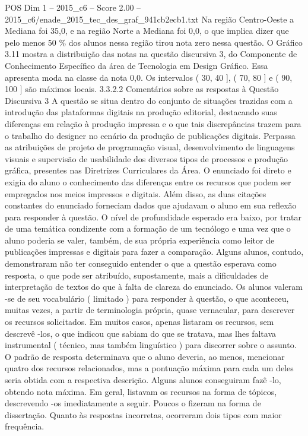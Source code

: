 \begin{textsample}{POS Dim 1 – 2015\_c6 – Score 2.00 – 2015\_c6/enade\_2015\_tec\_des\_graf\_941cb2ecb1.txt}
Na região Centro-Oeste a Mediana foi 35,0, e na região Norte a Mediana foi 0,0, o que implica dizer que pelo menos 50 \% dos alunos nessa região tirou nota zero nessa questão.
O Gráfico 3.11 mostra a distribuição das notas na questão discursiva 3, do Componente de Conhecimento Específico da área de Tecnologia em Design Gráfico.
Essa apresenta moda na classe da nota 0,0.
Os intervalos ( 30, 40 ], ( 70, 80 ] e ( 90, 100 ] são máximos locais. 3.3.2.2 Comentários sobre as respostas à Questão Discursiva 3 A questão se situa dentro do conjunto de situações trazidas com a introdução das plataformas digitais na produção editorial, destacando suas diferenças em relação à produção impressa e o que tais discrepâncias trazem para o trabalho do designer no cenário da produção de publicações digitais.
Perpassa as atribuições de projeto de programação visual, desenvolvimento de linguagens visuais e supervisão de usabilidade dos diversos tipos de processos e produção gráfica, presentes nas Diretrizes Curriculares da Área.
O enunciado foi direto e exigia do aluno o conhecimento das diferenças entre os recursos que podem ser empregados nos meios impressos e digitais.
Além disso, as duas citações constantes do enunciado forneciam dados que ajudavam o aluno em sua reflexão para responder à questão.
O nível de profundidade esperado era baixo, por tratar de uma temática condizente com a formação de um tecnólogo e uma vez que o aluno poderia se valer, também, de sua própria experiência como leitor de publicações impressas e digitais para fazer a comparação.
Alguns alunos, contudo, demonstraram não ter conseguido entender o que a questão esperava como resposta, o que pode ser atribuído, supostamente, mais a dificuldades de interpretação de textos do que à falta de clareza do enunciado.
Os alunos valeram -se de seu vocabulário ( limitado ) para responder à questão, o que aconteceu, muitas vezes, a partir de terminologia própria, quase vernacular, para descrever os recursos solicitados.
Em muitos casos, apenas listaram os recursos, sem descrevê -los, o que indicou que sabiam do que se tratava, mas lhes faltava instrumental ( técnico, mas também linguístico ) para discorrer sobre o assunto.
O padrão de resposta determinava que o aluno deveria, ao menos, mencionar quatro dos recursos relacionados, mas a pontuação máxima para cada um deles seria obtida com a respectiva descrição.
Alguns alunos conseguiram fazê -lo, obtendo nota máxima.
Em geral, listavam os recursos na forma de tópicos, descrevendo -os imediatamente a seguir.
Poucos o fizeram na forma de dissertação.
Quanto às respostas incorretas, ocorreram dois tipos com maior frequência.

\end{textsample}
